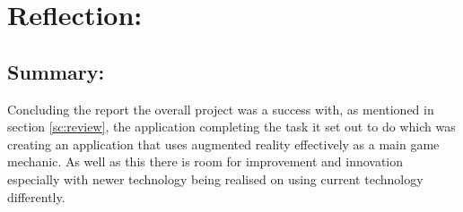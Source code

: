 \section{Reflection:}\label{sc:reflection}



\subsection{Summary:}
Concluding the report the overall project was a success with, as mentioned in section \ref{sc:review}, the application completing the task it set out to do which was creating an application that uses augmented reality effectively as a main game mechanic.
As well as this there is room for improvement and innovation especially with newer technology being realised on using current technology differently.
